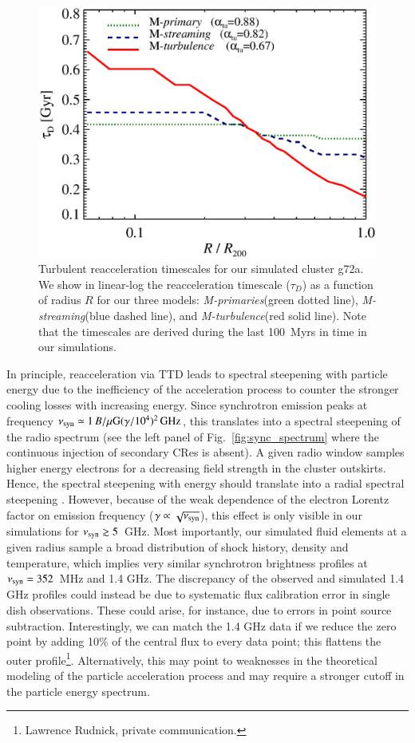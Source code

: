 \documentclass[fleqn,usenatbib,useAMS]{mnras}
\newcommand{\Mstream}{{\it M-streaming}\xspace}
\newcommand{\Mflatturb}{{\it M-turbulence}\xspace}
\newcommand{\Mprimary}{{\it M-primaries}\xspace}
\begin{document}
\begin{figure}
  \includegraphics[width=1.0\columnwidth]{tau_reacc.eps}
  \caption{Turbulent reacceleration timescales for our simulated
    cluster g72a. We show in linear-log the reacceleration timescale
    ($\tau_D$) as a function of radius $R$ for our three models:
    \Mprimary (green dotted line), \Mstream (blue dashed line), and
    \Mflatturb (red solid line). Note that the timescales are derived
    during the last 100~Myrs in time in our simulations.}
  \label{fig:tauD}
\end{figure}

In principle, reacceleration via TTD leads to spectral steepening with
particle energy due to the inefficiency of the acceleration process to
counter the stronger cooling losses with increasing energy. Since
synchrotron emission peaks at frequency $\nu_{\mathrm{syn}}\simeq 1\,
B/\mu{\mathrm{G}} (\gamma/10^4)^2\,{\mathrm{GHz}}$, this translates into a
spectral steepening of the radio spectrum (see the left panel of
Fig.~\ref{fig:sync_spectrum} where the continuous injection of
secondary CRes is absent). A given radio window samples higher energy
electrons for a decreasing field strength in the cluster
outskirts. Hence, the spectral steepening with energy should translate
into a radial spectral steepening \citep{brunetti12}. However, because
of the weak dependence of the electron Lorentz factor on emission
frequency ($\gamma\propto\sqrt{\nu_{\mathrm{syn}}}$), this effect is only
visible in our simulations for $\nu_{\mathrm{syn}}\gtrsim5$~GHz. Most
importantly, our simulated fluid elements at a given radius sample a
broad distribution of shock history, density and temperature, which
implies very similar synchrotron brightness profiles at
$\nu_{\mathrm{syn}}=352$~MHz and 1.4 GHz. The discrepancy of the observed
and simulated 1.4 GHz profiles could instead be due to systematic flux
calibration error in single dish observations. These could arise, for
instance, due to errors in point source subtraction. Interestingly, we
can match the 1.4 GHz data if we reduce the zero point by adding 10\%
of the central flux to every data point; this flattens the outer
profile\footnote{Lawrence Rudnick, private communication.}.
Alternatively, this may point to weaknesses in the theoretical
modeling of the particle acceleration process and may require a
stronger cutoff in the particle energy spectrum.
\end{document}
